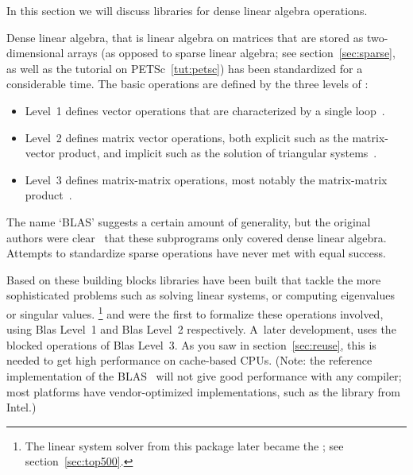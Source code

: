 
In this section we will discuss libraries for dense linear
algebra operations.

Dense linear algebra, that is linear algebra on matrices that are
stored as two-dimensional arrays (as opposed to sparse linear algebra;
see section~\ref{sec:sparse}, as well as the
tutorial on PETSc~\ref{tut:petsc}) has been standardized for a
considerable time. The basic operations are defined by the three
levels of :
\begin{itemize}
\item Level~1 defines vector operations that are characterized by a
  single loop~\cite{Lawson:blas}.
\item Level~2 defines matrix vector operations, both explicit such as
  the matrix-vector product, and implicit such as the solution of
  triangular systems~\cite{BLAS2}.
\item Level~3 defines matrix-matrix operations, most notably the
  matrix-matrix product~\cite{BLAS3}.
\end{itemize}
The name `BLAS' suggests a certain amount of generality, but the
original authors were clear~\cite{Lawson:blas} that these subprograms
only covered dense linear algebra. Attempts to standardize sparse
operations have never met with equal success.

Based on these building blocks libraries have been built that tackle
the more sophisticated problems such as solving linear systems, or
computing eigenvalues or singular values.
\footnote{The linear system solver from this
  package later became the ; see
  section~\ref{sec:top500}.} and  were the first to formalize
these operations involved, using Blas Level~1 and Blas Level~2
respectively.  A~later development,  uses the
blocked operations of Blas Level~3. As you saw in
section~\ref{sec:reuse}, this is needed to get high performance on
cache-based CPUs. (Note: the reference implementation of the
BLAS~\cite{reference-blas} will not give good performance with any
compiler; most platforms have vendor-optimized implementations, such
as the  library from Intel.)


